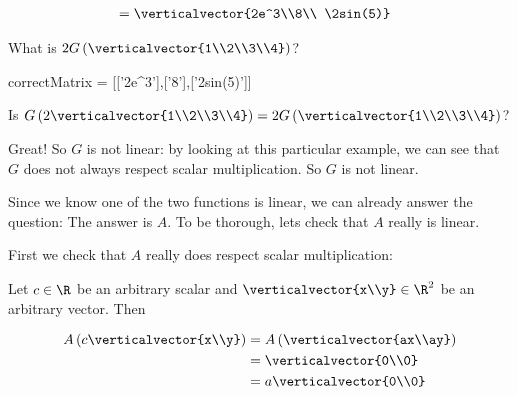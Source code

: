 \documentclass{ximera}
\begin{document}
\begin{question}
\begin{solution}
\begin{hint}
\begin{question}
\begin{solution}
\begin{hint}
\begin{align*}
					&=\verticalvector{2e^3\\8\\ \2sin(5)}
			\end{align*}
		\end{hint}
        	 What is $2G\left(\verticalvector{1\\2\\3\\4}\right)$?
        	 \begin{matrix-answer}[name=v]
    			  correctMatrix = [['2e^3'],['8'],['2sin(5)']]
        	 \end{matrix-answer}
        	\end{solution}
        	\begin{solution}
        		Is $G\left( 2\verticalvector{1\\2\\3\\4}\right) =  2G\left(\verticalvector{1\\2\\3\\4}\right)$?
        		\begin{multiple-choice}
        		\end{multiple-choice}
        	\end{solution}
        	
        	Great!  So $G$ is not linear:  by looking at this particular example, we can see that $G$ does not always respect scalar multiplication.  So $G$ is not linear.
		
        	Since we know one of the two functions is linear, we can already answer the question:  The answer is $A$.  To be thorough, lets check that $A$ really is linear.
		
        	First we check that $A$ really does respect scalar multiplication:
		
        	Let $c \in \R$ be an arbitrary scalar and $\verticalvector{x\\y} \in \R^2$ be an arbitrary vector.  Then
		
        	\begin{align*}
        	 A\left(c\verticalvector{x\\y}\right) &= A\left( \verticalvector{ax\\ay}\right)\\
        	 	&=\verticalvector{0\\0}\\
        	 	&=a\verticalvector{0\\0}
        	 \end{align*}
		 

\end{question}
\end{hint}
\end{solution}
\end{question}
\end{document}
